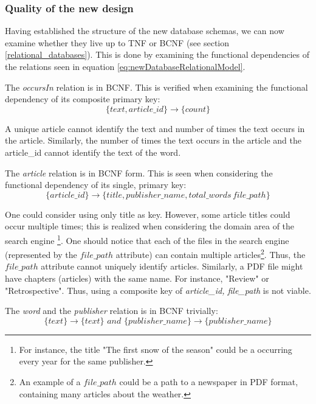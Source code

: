 \subsubsection*{Quality of the new design}
Having established the structure of the new database schemas, we can now examine whether they live up to TNF or BCNF (see section \ref{relational_databases}).
This is done by examining the functional dependencies of the relations seen in equation \ref{eq:newDatabaseRelationalModel}.

The \textit{occursIn} relation is in BCNF. 
This is verified when examining the functional dependency of its composite primary key:
\begin{equation*}
 \{text,article\_id\}\rightarrow \{count\}   
\end{equation*}

A unique article cannot identify the text and number of times the text occurs in the article.
Similarly, the number of times the text occurs in the article and the article\_id cannot identify the text of the word.

The \textit{article} relation is in BCNF form. 
This is seen when considering the functional dependency of its single, primary key:
\begin{equation*}
    \{article\_id\} \rightarrow \{title, publisher\_name,total\_words\, file\_path\}
\end{equation*}

One could consider using only title as key. 
However, some article titles could occur multiple times; this is realized when considering the domain area of the \knox{} search engine
\footnote{For instance, the title "The first snow of the season" could be a occurring every year for the same publisher.}.
One should notice that each of the files in the search engine (represented by the $file\_path$ attribute) can contain multiple articles\footnote{An example of a $file\_path$ could be a path to a newspaper in PDF format, containing many articles about the weather.}.
Thus, the $file\_path$ attribute cannot uniquely identify articles.
Similarly, a PDF file might have chapters (articles) with the same name. For instance, "Review" or "Retrospective".
Thus, using a composite key of \textit{article\_id, file\_path} is not viable. 

The \textit{word} and the \textit{publisher} relation is in BCNF trivially:
\begin{equation*}
    \{ text\} \rightarrow \{text\} \textit{\ and\ } \{ publisher\_name \} \rightarrow \{ publisher\_name\}
\end{equation*}

